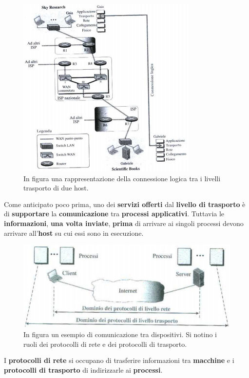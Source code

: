 \documentclass[11pt,a4paper,oneside]{book}
\theoremstyle{definition}
\begin{document}
\begin{figure}[!h]
	\includegraphics[scale=0.7]{Immagini/Trasporto.png}
	\centering
	\caption{In figura una rappresentazione della connessione logica tra i livelli trasporto di due host.}
\end{figure}
Come anticipato poco prima, uno dei \textbf{servizi offerti} dal \textbf{livello di trasporto} è di \textbf{supportare} la \textbf{comunicazione} tra \textbf{processi applicativi}. Tuttavia le \textbf{informazioni}, \textbf{una volta inviate}, \textbf{prima} di arrivare ai singoli processi devono arrivare all'\textbf{host} su cui essi sono in esecuzione.
\begin{figure}[!h]
	\includegraphics[scale=0.9]{Immagini/Trasporto_host.png}
	\centering
	\caption{In figura un esempio di comunicazione tra dispositivi. Si notino i ruoli dei protocolli di rete e dei protocolli di trasporto.}
\end{figure}\newline
I \textbf{protocolli di rete} si occupano di trasferire informazioni tra \textbf{macchine} e i \textbf{protocolli di trasporto} di indirizzarle ai \textbf{processi}.

\pagebreak
\end{document}
